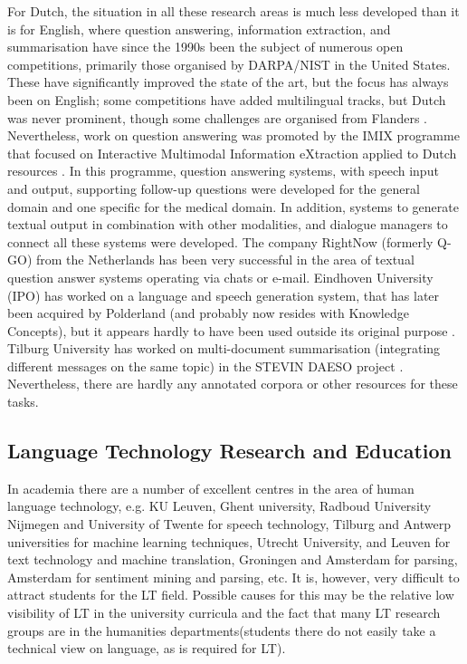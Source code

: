 \begin{multicols}{2}
For Dutch, the situation in all these research areas is much less developed than it is for English, where question answering, information extraction, and summarisation have since the 1990s been the subject of numerous open competitions, primarily those organised by DARPA/NIST in the United States. These have significantly improved the state of the art, but the focus has always been on English; some competitions have added multilingual tracks, but Dutch was never prominent, though some challenges are organised from Flanders \cite{SemEval}.  Nevertheless, work on question answering was promoted by the IMIX programme that focused on Interactive Multimodal Information eXtraction applied to Dutch resources \cite{IMIX}.  In this programme, question answering systems, with speech input and output, supporting follow-up questions were developed for the general domain and one specific for the medical domain. In addition, systems to generate textual output in combination with other modalities, and dialogue managers to connect all these systems were developed. The company RightNow (formerly Q-GO) from the Netherlands has been very successful in the area of textual question answer systems operating via chats or e-mail.  Eindhoven University (IPO) has worked on a language and speech generation system, that has later been acquired by Polderland (and probably now resides with Knowledge Concepts), but it appears hardly to have been used outside its original purpose \cite{Theune:2003}.  Tilburg University has worked on multi-document summarisation (integrating different messages on the same topic) in the STEVIN DAESO project \cite{DAESO}.  Nevertheless, there are hardly any annotated corpora or other resources for these tasks.

\subsection{Language Technology Research and Education}

    In academia there are a number of excellent centres in the area of human language technology, e.g.  KU Leuven, Ghent university, Radboud University Nijmegen and University of Twente for speech technology, Tilburg and Antwerp universities for machine learning techniques, Utrecht University, and Leuven for text technology and machine translation, Groningen and Amsterdam for parsing, Amsterdam for sentiment mining and parsing, etc. It is, however, very difficult to attract students for the LT field. Possible causes for this may be the relative low visibility of LT in the university curricula and the fact that many LT research groups are in the humanities departments(students there do not easily take a technical view on language, as is required for LT).


\end{multicols}
